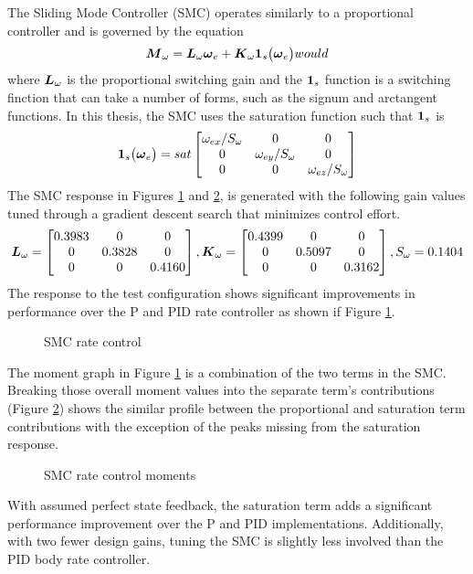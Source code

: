 The Sliding Mode Controller (SMC) operates similarly to a proportional controller and is governed by the equation
\begin{equation}
  \boldsymbol{M}_{\omega} = \boldsymbol{L}_{\omega} \boldsymbol{\omega}_e + \boldsymbol{K}_{\omega}\boldsymbol{1}_s \big(\boldsymbol{\omega}_e \big)
  \label{eqn:SMController}would
\end{equation}
where $\boldsymbol{L}_{\omega}$ is the proportional switching gain and the $\boldsymbol{1}_s$ function is a switching finction that can take a number of forms, such as the signum and arctangent functions.  In this thesis, the SMC uses the saturation function such that $\boldsymbol{1}_s$ is
\begin{equation}
  \boldsymbol{1}_s \big(\boldsymbol{\omega}_e \big) = sat \begin{bmatrix} \omega_{ex} / S_{\omega} &0 &0 \\ 0 & \omega_{ey} / S_{\omega} & 0 \\ 0 & 0 & \omega_{ez} / S_{\omega} \end{bmatrix}
\end{equation}
The SMC response in Figures \ref{fig:SMCRateControl} and \ref{fig:SMCRateControlMoments}, is generated with the following gain values tuned through a gradient descent search that minimizes control effort.
\begin{equation}
    \boldsymbol{L}_{\omega} = \begin{bmatrix} 0.3983 & 0 & 0 \\ 0 & 0.3828 & 0 \\ 0 & 0 & 0.4160 \end{bmatrix},
    \boldsymbol{K}_{\omega} = \begin{bmatrix} 0.4399 & 0 & 0 \\ 0 & 0.5097 & 0 \\ 0 & 0 & 0.3162 \end{bmatrix},
    S_{\omega} = 0.1404
  \label{SMCRateControlGains}
\end{equation}
The response to the test configuration shows significant improvements in performance over the P and PID rate controller as shown if Figure \ref{fig:SMCRateControl}.
\begin{figure}[H]
  \centerline{}
  \caption{SMC rate control}
  \label{fig:SMCRateControl}
\end{figure}
The moment graph in Figure \ref{fig:SMCRateControl} is a combination of the two terms in the SMC.  Breaking those overall moment values into the separate term's contributions (Figure \ref{fig:SMCRateControlMoments}) shows the similar profile between the proportional and saturation term contributions with the exception of the peaks missing from the saturation response.
\begin{figure}[H]
  \centerline{}
  \caption{SMC rate control moments}
  \label{fig:SMCRateControlMoments}
\end{figure}
With assumed perfect state feedback, the saturation term adds a significant performance improvement over the P and PID implementations.  Additionally, with two fewer design gains, tuning the SMC is slightly less involved than the PID body rate controller.

